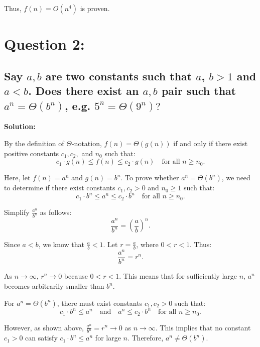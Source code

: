 \documentclass{article}
\begin{document}
Thus, \( f(n) = O(n^4) \) is proven.

\pagebreak
\section*{Question 2:}
\subsection*{Say \( a , b \) are two constants such that \( a \), \( b  > 1\) and \(a < b \). Does there exist an \( a , b \) pair such that \( a^n = \Theta(b^n)\), e.g. \( 5^n = \Theta(9^n)?\) }

\textbf{Solution:}  

By the definition of \( \Theta \)-notation, \( f(n) = \Theta(g(n)) \) if and only if there exist positive constants \( c_1, c_2, \) and \( n_0 \) such that:
\[
c_1 \cdot g(n) \leq f(n) \leq c_2 \cdot g(n) \quad \text{for all } n \geq n_0.
\]

Here, let \( f(n) = a^n \) and \( g(n) = b^n \). To prove whether \( a^n = \Theta(b^n) \), we need to determine if there exist constants \( c_1, c_2 > 0 \) and \( n_0 \geq 1 \) such that:
\[
c_1 \cdot b^n \leq a^n \leq c_2 \cdot b^n \quad \text{for all } n \geq n_0.
\]

Simplify \( \frac{a^n}{b^n} \) as follows:
\[
\frac{a^n}{b^n} = \left( \frac{a}{b} \right)^n.
\]

Since \( a < b \), we know that \( \frac{a}{b} < 1 \). Let \( r = \frac{a}{b} \), where \( 0 < r < 1 \). Thus:
\[
\frac{a^n}{b^n} = r^n.
\]

As \( n \to \infty \), \( r^n \to 0 \) because \( 0 < r < 1 \). This means that for sufficiently large \( n \), \( a^n \) becomes arbitrarily smaller than \( b^n \). 

For \( a^n = \Theta(b^n) \), there must exist constants \( c_1, c_2 > 0 \) such that:
\[
c_1 \cdot b^n \leq a^n \quad \text{and} \quad a^n \leq c_2 \cdot b^n \quad \text{for all } n \geq n_0.
\]

However, as shown above, \( \frac{a^n}{b^n} = r^n \to 0 \) as \( n \to \infty \). This implies that no constant \( c_1 > 0 \) can satisfy \( c_1 \cdot b^n \leq a^n \) for large \( n \). Therefore, \( a^n \neq \Theta(b^n) \).
\end{document}
